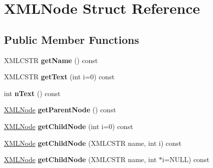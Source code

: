 \hypertarget{struct_x_m_l_node}{}\section{X\+M\+L\+Node Struct Reference}
\label{struct_x_m_l_node}
\subsection*{Public Member Functions}
\begin{DoxyCompactItemize}
\item 
X\+M\+L\+C\+S\+TR {\bfseries get\+Name} () const \hypertarget{struct_x_m_l_node_a7e07715aa0ed894da96bd66c90d423f0}{}\label{struct_x_m_l_node_a7e07715aa0ed894da96bd66c90d423f0}

\item 
X\+M\+L\+C\+S\+TR {\bfseries get\+Text} (int i=0) const \hypertarget{struct_x_m_l_node_aeb607292b18d4615b7c169c7c08c0a8b}{}\label{struct_x_m_l_node_aeb607292b18d4615b7c169c7c08c0a8b}

\item 
int {\bfseries n\+Text} () const \hypertarget{struct_x_m_l_node_a22e7e7cf8f173a1ec3ec3d6ff60819d9}{}\label{struct_x_m_l_node_a22e7e7cf8f173a1ec3ec3d6ff60819d9}

\item 
\hyperlink{struct_x_m_l_node}{X\+M\+L\+Node} {\bfseries get\+Parent\+Node} () const \hypertarget{struct_x_m_l_node_ad30a8420556e220742c681e353a875d8}{}\label{struct_x_m_l_node_ad30a8420556e220742c681e353a875d8}

\item 
\hyperlink{struct_x_m_l_node}{X\+M\+L\+Node} {\bfseries get\+Child\+Node} (int i=0) const \hypertarget{struct_x_m_l_node_a77a21438b6d48a52cf8a1270f82f4475}{}\label{struct_x_m_l_node_a77a21438b6d48a52cf8a1270f82f4475}

\item 
\hyperlink{struct_x_m_l_node}{X\+M\+L\+Node} {\bfseries get\+Child\+Node} (X\+M\+L\+C\+S\+TR name, int i) const \hypertarget{struct_x_m_l_node_af46d002a855acb46c18e47b70e686808}{}\label{struct_x_m_l_node_af46d002a855acb46c18e47b70e686808}

\item 
\hyperlink{struct_x_m_l_node}{X\+M\+L\+Node} {\bfseries get\+Child\+Node} (X\+M\+L\+C\+S\+TR name, int $\ast$i=N\+U\+LL) const \hypertarget{struct_x_m_l_node_ac2e8c96fc51b59b6667ee02785cb6943}{}\label{struct_x_m_l_node_ac2e8c96fc51b59b6667ee02785cb6943}


\end{DoxyCompactItemize}
